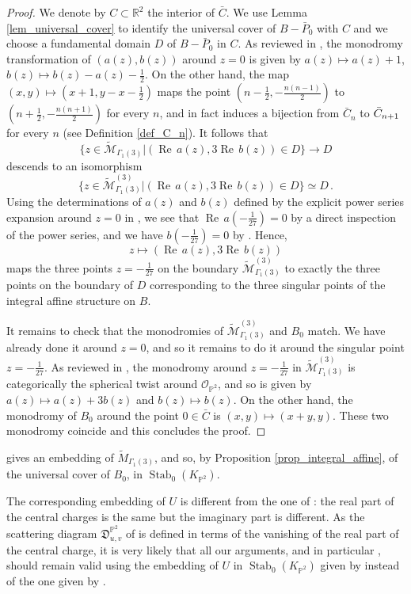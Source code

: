 \documentclass[11pt,letterpaper]{amsart}
\newcommand\PP{\mathbb P}
\newcommand\R{\mathbb R}
\newcommand\cM{\mathcal M}
\newcommand\fD{\mathfrak D}
\newcommand\Rea{\operatorname{Re}\,}
\newcommand\Stab{\operatorname{Stab}}
\begin{document}
\begin{proof}
We denote by $C \subset \R^2$ the interior of 
$\bar{C}$.
We use Lemma 
\ref{lem_universal_cover} to identify the universal cover of $B-\bar{P}_0$ with 
$C$ and we choose a fundamental domain $D$ of 
$B-\bar{P}_0$ in $C$. As reviewed in \cite[\S 9]{MR2852118}, the monodromy transformation of
$(a(z), b(z))$ around $z=0$ is given by $a(z) \mapsto a(z)+1$, $b(z) \mapsto b(z)-a(z)-\frac{1}{2}$.
On the other hand, the map $(x,y) \mapsto (x+1,y-x-\frac{1}2)$ maps the point
$(n-\frac{1}{2},-\frac{n(n-1)}{2})$
to $(n+\frac{1}{2},-\frac{n(n+1)}{2})$ for every $n$,
and in fact induces
a bijection from 
$\bar{C}_n$ to $\Bar{C}_{n+1}$ for every $n$ (see Definition \ref{def_C_n}).
It follows that
\[ \{z \in \widetilde{\cM}_{\Gamma_1(3)}|
(\Rea a(z), 3 \Rea b(z)) \in D \} \rightarrow D \]
descends to an isomorphism 
\[\{z \in \widetilde{\cM}^{(3)}_{\Gamma_1(3)}|
(\Rea a(z), 3 \Rea b(z))\in D \} \simeq  D\,.\]
Using the determinations of $a(z)$ and $b(z)$ defined by the explicit power series expansion around $z=0$ in \cite[p43]{MR2852118}, we see that $\Rea a(-\frac{1}{27})=0$ by a direct inspection of the power series, and we have $b(-\frac{1}{27})=0$ by \cite[p45]{MR2852118}. Hence, 
\[ z \mapsto (\Rea a(z), 3 \Rea b(z))\] 
maps the three points
$z=-\frac{1}{27}$ on the boundary 
$\widetilde{\cM}^{(3)}_{\Gamma_1(3)}$ to exactly the three points on the boundary of $D$ corresponding to the three singular points of the integral affine structure on $B$.

It remains to check that the monodromies of $\widetilde{\cM}^{(3)}_{\Gamma_1(3)}$ and $B_0$ match.
We have already done it around $z=0$, and so it remains to do it around the singular point $z=-\frac{1}{27}$. 
As reviewed in \cite[\S 9]{MR2852118}, the monodromy  around $z=-\frac{1}{27}$ in $\widetilde{\cM}^{(3)}_{\Gamma_1(3)}$
is categorically the spherical twist around $\mathcal{O}_{\PP^2}$, and so is given by $a(z) \mapsto a(z)+3b(z)$ and $b(z) \mapsto b(z)$. On the other hand, the monodromy of $B_0$ around the point $0 \in \bar{C}$ is $(x,y)\mapsto (x+y,y)$. 
These two monodromy coincide and this concludes the proof.
\end{proof}

\cite[Theorem 9.3]{MR2852118} gives an embedding of 
$\widetilde{M}_{\Gamma_1(3)}$, and so, by Proposition \ref{prop_integral_affine}, of the universal cover of $B_0$, in $\Stab_0(K_{\PP^2})$. 

The corresponding embedding of $U$ is different from the one of 
\cite[Proposition 2.14]{bousseau2019scattering}: the real part of the central charges is the same but the imaginary part is different.
As the scattering diagram $\fD^{\PP^2}_{u,v}$ of 
\cite{bousseau2019scattering} 
is defined in terms of the vanishing of the real part of the central charge, it is very likely that all our arguments, and in particular \cite[Theorem 5.9]{bousseau2019scattering}, should remain valid using the embedding of 
$U$ in $\Stab_0(K_{\PP^2})$ given by \cite[Theorem 9.3]{MR2852118} instead of the one given by
\cite[Proposition 2.14]{bousseau2019scattering}.
\end{document}

